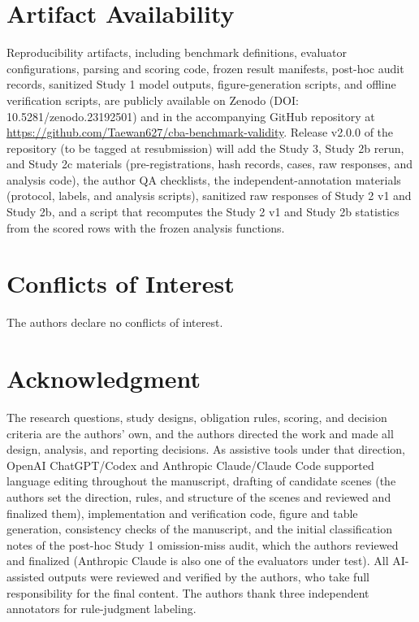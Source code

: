 \documentclass{ieeeaccess}
\begin{document}
\section*{Artifact Availability}
Reproducibility artifacts, including benchmark definitions, evaluator configurations, parsing and scoring code, frozen result manifests, post-hoc audit records, sanitized Study 1 model outputs, figure-generation scripts, and offline verification scripts, are publicly available on Zenodo (DOI: 10.5281/zenodo.23192501) and in the accompanying GitHub repository at \url{https://github.com/Taewan627/cba-benchmark-validity}. Release v2.0.0 of the repository (to be tagged at resubmission) will add the Study 3, Study 2b rerun, and Study 2c materials (pre-registrations, hash records, cases, raw responses, and analysis code), the author QA checklists, the independent-annotation materials (protocol, labels, and analysis scripts), sanitized raw responses of Study 2 v1 and Study 2b, and a script that recomputes the Study 2 v1 and Study 2b statistics from the scored rows with the frozen analysis functions.

\section*{Conflicts of Interest}
The authors declare no conflicts of interest.

\section*{Acknowledgment}
The research questions, study designs, obligation rules, scoring, and decision criteria are the authors' own, and the authors directed the work and made all design, analysis, and reporting decisions. As assistive tools under that direction, OpenAI ChatGPT/Codex and Anthropic Claude/Claude Code supported language editing throughout the manuscript, drafting of candidate scenes (the authors set the direction, rules, and structure of the scenes and reviewed and finalized them), implementation and verification code, figure and table generation, consistency checks of the manuscript, and the initial classification notes of the post-hoc Study 1 omission-miss audit, which the authors reviewed and finalized (Anthropic Claude is also one of the evaluators under test). All AI-assisted outputs were reviewed and verified by the authors, who take full responsibility for the final content. The authors thank three independent annotators for rule-judgment labeling.
\end{document}
